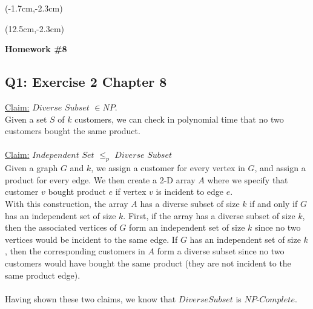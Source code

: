 \documentclass[12pt, oneside]{article}
\begin{document}
\begin{textblock*}{4cm}(-1.7cm,-2.3cm)
\end{textblock*}

\begin{textblock*}{8cm}(12.5cm,-2.3cm)
\end{textblock*}


\vspace{1cm}

\makeatletter
\setlength{\@fptop}{0pt}
\makeatother

\begin{center}
\textbf{\Large Homework \#8}
\end{center}


\subsection*{Q1: Exercise 2 Chapter 8}
\underline{Claim:} $Diverse$ $Subset$ $\in NP$.\\
Given a set $S$ of $k$ customers, we can check in polynomial time that no two customers bought the same product.\\\\
\underline{Claim:} $Independent$ $Set$ $\leq_p$ $Diverse$ $Subset$\\
Given a graph $G$ and $k$, we assign a customer for every vertex in $G$, and assign a product for every edge. We then create a 2-D array $A$ where we specify that customer $v$ bought product $e$ if vertex $v$ is incident to edge $e$.\\
With this construction, the array $A$ has a diverse subset of size $k$ if and only if $G$ has an independent set of size $k$. First, if the array has a diverse subset of size $k$, then the associated vertices of $G$ form an independent set of size $k$ since no two vertices would be incident to the same edge. If $G$ has an independent set of size $k$, then the corresponding customers in $A$ form a diverse subset since no two customers would have bought the same product (they are not incident to the same product edge).\\\\
Having shown these two claims, we know that $Diverse Subset$ is $NP$-$Complete$.\\
\end{document}
